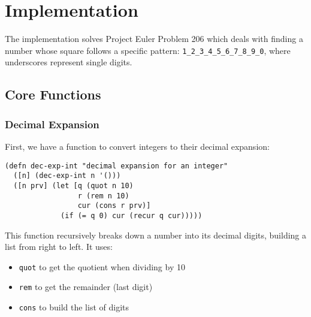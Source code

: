 \section{Implementation}

The implementation solves Project Euler Problem 206 which deals with finding a number whose square
 follows a specific pattern: \texttt{1\_2\_3\_4\_5\_6\_7\_8\_9\_0}, where underscores represent single digits.

\subsection{Core Functions}

\subsubsection{Decimal Expansion}
First, we have a function to convert integers to their decimal expansion:

\begin{lstlisting}
(defn dec-exp-int "decimal expansion for an integer"
  ([n] (dec-exp-int n '()))
  ([n prv] (let [q (quot n 10) 
                 r (rem n 10)
                 cur (cons r prv)]
             (if (= q 0) cur (recur q cur)))))
\end{lstlisting}

This function recursively breaks down a number into its decimal digits, building a list from right to left. It uses:
\begin{itemize}
    \item \texttt{quot} to get the quotient when dividing by 10
    \item \texttt{rem} to get the remainder (last digit)
    \item \texttt{cons} to build the list of digits
\end{itemize}